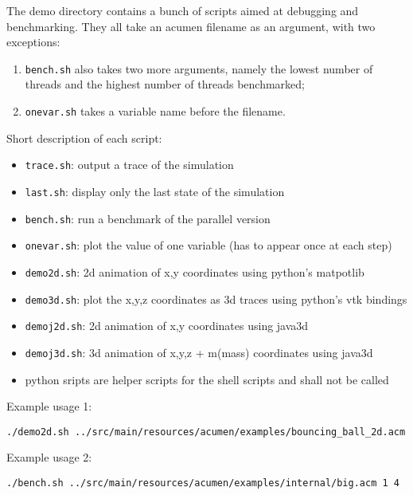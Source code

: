 The demo directory contains a bunch of scripts aimed at debugging and benchmarking. They all take an acumen filename as an argument, with two exceptions:

\begin{enumerate}
   \item \lstinline{bench.sh} also takes two more arguments, namely the lowest number of threads and the highest number of threads benchmarked;
   \item \lstinline{onevar.sh} takes a variable name before the filename. 
\end{enumerate}

Short description of each script:

\begin{itemize}
    \item \lstinline{trace.sh}:  output a trace of the simulation
    \item \lstinline{last.sh}:  display only the last state of the simulation
    \item \lstinline{bench.sh}:  run a benchmark of the parallel version
    \item \lstinline{onevar.sh}:  plot the value of one variable (has to appear once at each step)
    \item \lstinline{demo2d.sh}:  2d animation of x,y coordinates using python's matpotlib
    \item \lstinline{demo3d.sh}:  plot the x,y,z coordinates as 3d traces using python's vtk bindings
    \item \lstinline{demoj2d.sh}:  2d animation of x,y coordinates using java3d
    \item \lstinline{demoj3d.sh}:  3d animation of x,y,z + m(mass) coordinates using java3d
    \item python sripts are helper scripts for the shell scripts and shall not be called 
\end{itemize}

Example usage 1:

\begin{lstlisting}
./demo2d.sh ../src/main/resources/acumen/examples/bouncing_ball_2d.acm
\end{lstlisting}

Example usage 2:

\begin{lstlisting}
./bench.sh ../src/main/resources/acumen/examples/internal/big.acm 1 4
\end{lstlisting}

